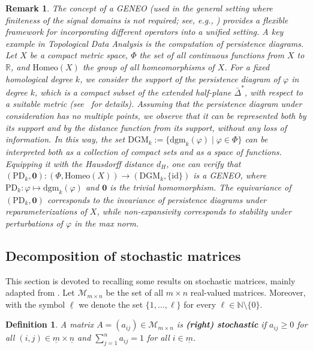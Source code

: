 \documentclass[11pt]{article}
\newcommand{\R}{\mathbb{R}}
\newcommand{\N}{\mathbb{N}}
\newcommand{\id}{\mathrm{id}}
\newtheorem{definition}[theorem]{Definition}
\newtheorem{rem}[theorem]{Remark}
\begin{document}
\begin{rem}
\label{rem:PH}
The concept of a GENEO (used in the general setting where finiteness of the signal domains is not required; see, e.g., \cite{bergomi2019towards}) provides a flexible framework for incorporating different operators into a unified setting. A key example in Topological Data Analysis is the computation of persistence diagrams. Let $X$ be a compact metric space, $\Phi$ the set of all continuous functions from $X$ to $\R$, and $\mathrm{Homeo}(X)$ the group of all homeomorphisms of $X$. For a fixed homological degree $k$, 
we consider
the support of the persistence diagram of $\varphi$ in degree $k$, which is a compact subset of the extended half-plane $\bar\Delta^*$, with respect to a suitable metric (see~\cite{frosini2025matching} for details). 
Assuming that the persistence diagram under consideration has no multiple points, we observe that it can be represented both by its support and by the distance function from its support, without any loss of information. In this way, the set
$\mathrm{DGM}_k := \{ \mathrm{dgm}_k(\varphi) \mid \varphi \in \Phi \}$
can be interpreted both as a collection of compact sets and as a space of functions.
Equipping it 
with the Hausdorff distance $d_H$, one can verify that 
$(\mathrm{PD}_k,\mathbf{0}) \colon (\Phi, \mathrm{Homeo}(X)) \to (\mathrm{DGM}_k, \{\id\})$
is a GENEO, where $\mathrm{PD}_k \colon \varphi \mapsto \mathrm{dgm}_k(\varphi)$ and $\mathbf{0}$ is the trivial homomorphism. The equivariance of $(\mathrm{PD}_k,\mathbf{0})$ corresponds to the invariance of persistence diagrams under reparameterizations of $X$, while non-expansivity corresponds to stability under perturbations of $\varphi$ in the max norm.
\end{rem}

\subsection{Decomposition of stochastic matrices}
This section is devoted to recalling some results on stochastic matrices, mainly adapted from \cite{doi:10.1080/03081087.2020.1733461}. Let $\mathcal{M}_{m \times n}$ be the set of all $m \times n$ real-valued matrices. Moreover, with the symbol $\underline{\ell}$ we denote the set $\{1, \dots, \ell\}$ for every $\ell \in \N \setminus \{0\}$.

\begin{definition}
A matrix $A = (a_{ij}) \in \mathcal{M}_{m \times n}$ is \textbf{(right) stochastic} if $a_{ij} \ge 0$ for all $(i,j) \in \underline{m} \times \underline{n}$ and $\sum_{j=1}^n a_{ij}=1$ for all $i \in \underline{m}$.
\end{definition}
\end{document}
